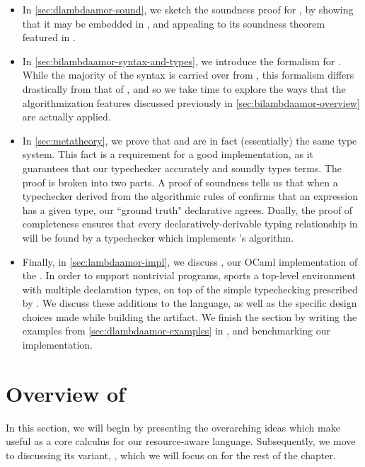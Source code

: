 \begin{itemize}
  \item In \autoref{sec:dlambdaamor-sound}, we sketch the soundness proof for \dlambdaamor, by showing that it may be embedded in \lambdaamor, and appealing to its soundness theorem featured in \citet{rajani-et-al:popl21}.
 
 \item In \autoref{sec:bilambdaamor-syntax-and-types}, we introduce the formalism for \bilambdaamor. While the majority of the syntax is carried over from \dlambdaamor, this formalism differs drastically from that of \dlambdaamor, and so we take time to explore the ways that the algorithmization features discussed previously in \autoref{sec:bilambdaamor-overview} are actually applied.
 
 \item In \autoref{sec:metatheory}, we prove that \bilambdaamor and \dlambdaamor are in fact (essentially) the same type system. This fact is a requirement for a good implementation, as it guarantees that our typechecker accurately and soundly types terms. The proof is broken into two parts. A proof of soundness tells us that when a typechecker derived from the algorithmic rules of \bilambdaamor confirms that an expression has a given type, our ``ground truth" declarative \dlambdaamor agrees. Dually, the proof of completeness ensures that every declaratively-derivable typing relationship in \dlambdaamor will be found by a typechecker which implements \bilambdaamor's algorithm.
 
 \item Finally, in \autoref{sec:lambdaamor-impl}, we discuss \lambdaamorimpl, our OCaml implementation of the \dlambdaamor. In order to support nontrivial programs, \lambdaamorimpl sports a top-level environment with multiple declaration types, on top of the simple typechecking prescribed by \bilambdaamor. We discuss these additions to the language, as well as the specific design choices made while building the artifact. We finish the section by writing the examples from \autoref{sec:dlambdaamor-examples} in \lambdaamorimpl, and benchmarking our implementation.
\end{itemize}


\section{Overview of \dlambdaamor} 
\label{sec:dlambdaamor-overview}
In this section, we will begin by presenting the overarching ideas which make \lambdaamor useful as a core calculus for our resource-aware language. Subsequently, we move to discussing its variant, \dlambdaamor, which we will focus on for the rest of the chapter.

